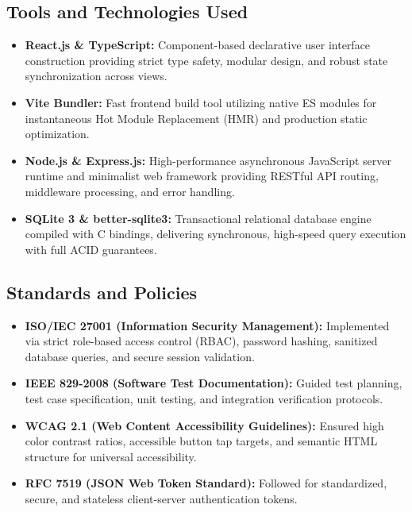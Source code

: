 \documentclass[10pt]{report}
\begin{document}
\subsection{Tools and Technologies Used}
\begin{itemize}
\item \textbf{React.js \& TypeScript:} Component-based declarative user interface construction providing strict type safety, modular design, and robust state synchronization across views.
\item \textbf{Vite Bundler:} Fast frontend build tool utilizing native ES modules for instantaneous Hot Module Replacement (HMR) and production static optimization.
\item \textbf{Node.js \& Express.js:} High-performance asynchronous JavaScript server runtime and minimalist web framework providing RESTful API routing, middleware processing, and error handling.
\item \textbf{SQLite 3 \& better-sqlite3:} Transactional relational database engine compiled with C bindings, delivering synchronous, high-speed query execution with full ACID guarantees.
\end{itemize}

\subsection{Standards and Policies}
\begin{itemize}
\item \textbf{ISO/IEC 27001 (Information Security Management):} Implemented via strict role-based access control (RBAC), password hashing, sanitized database queries, and secure session validation.
\item \textbf{IEEE 829-2008 (Software Test Documentation):} Guided test planning, test case specification, unit testing, and integration verification protocols.
\item \textbf{WCAG 2.1 (Web Content Accessibility Guidelines):} Ensured high color contrast ratios, accessible button tap targets, and semantic HTML structure for universal accessibility.
\item \textbf{RFC 7519 (JSON Web Token Standard):} Followed for standardized, secure, and stateless client-server authentication tokens.
\end{itemize}

\end{document}

